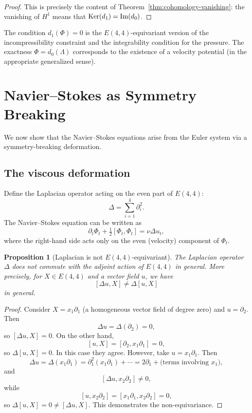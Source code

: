 \documentclass[reqno,10pt]{amsart}
\theoremstyle{plain}
\newtheorem{proposition}[theorem]{Proposition}
\theoremstyle{definition}
\def\Ker{{\rm Ker}}
\def\gE{E(4,4)}
\begin{document}
\begin{proof}
This is precisely the content of Theorem~\ref{thm:cohomology-vanishing}: the vanishing of $H^1$ means that $\Ker(d_1) = \text{Im}(d_0)$.
\end{proof}

The condition $d_1(\Phi)=0$ is the $\gE$-equivariant version of the incompressibility constraint and the integrability condition for the pressure. The exactness $\Phi = d_0(\Lambda)$ corresponds to the existence of a velocity potential (in the appropriate generalized sense).

\section{Navier--Stokes as Symmetry Breaking}

We now show that the Navier--Stokes equations arise from the Euler system via a symmetry-breaking deformation.

\subsection{The viscous deformation}

Define the Laplacian operator acting on the even part of $\gE$:
\[
  \Delta = \sum_{i=1}^4 \partial_i^2.
\]
The Navier--Stokes equation can be written as
\begin{equation}\label{eq:ns-bracket}
  \partial_t\Phi_t + \tfrac{1}{2}[\Phi_t,\Phi_t] = \nu\Delta u_t,
\end{equation}
where the right-hand side acts only on the even (velocity) component of $\Phi_t$.

\begin{proposition}[Laplacian is not $\gE$-equivariant]
The Laplacian operator $\Delta$ does \emph{not} commute with the adjoint action of $\gE$ in general. More precisely, for $X\in\gE$ and a vector field $u$, we have
\[
  [\Delta u, X] \neq \Delta[u,X]
\]
in general.
\end{proposition}

\begin{proof}
Consider $X = x_1\partial_1$ (a homogeneous vector field of degree zero) and $u = \partial_2$. Then
\[
  \Delta u = \Delta(\partial_2) = 0,
\]
so $[\Delta u, X] = 0$. On the other hand,
\[
  [u,X] = [\partial_2, x_1\partial_1] = 0,
\]
so $\Delta[u,X] = 0$. In this case they agree. However, take $u = x_1\partial_1$. Then
\[
  \Delta u = \Delta(x_1\partial_1) = \partial_1^2(x_1\partial_1) + \cdots = 2\partial_1 + \text{(terms involving $x_1$)},
\]
and
\[
  [\Delta u, x_2\partial_2] \neq 0,
\]
while
\[
  [u, x_2\partial_2] = [x_1\partial_1, x_2\partial_2] = 0,
\]
so $\Delta[u,X] = 0 \neq [\Delta u, X]$. This demonstrates the non-equivariance.
\end{proof}
\end{document}
